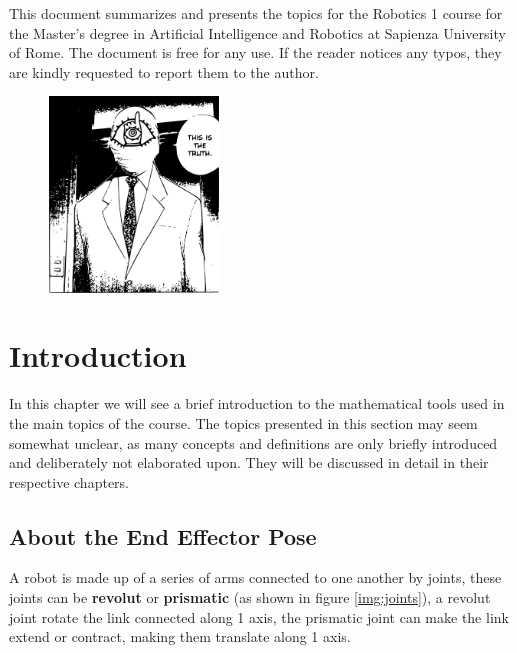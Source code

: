 \documentclass[10pt, letterpaper]{report}
\newcommand{\titolo}{Robotics 1 }
\begin{document}
\newpage
\Large
This document summarizes and presents the topics for the \titolo course for the Master's degree in Artificial Intelligence and Robotics at Sapienza University of Rome. The document is free for any use. If the reader notices any typos, they are kindly requested to report them to the author.
\vfill
\begin{figure}[h!]
    \raggedright
    \includegraphics[width=0.4\textwidth,right ]{../../preamble/tomodachi.pdf} 
\end{figure}
\newpage %
\normalsize

\tableofcontents 
\newpage

\fancyhf{}
\fancyhead[L]{\nouppercase{\leftmark}}
\fancyfoot[C]{\thepage}
\fancyfoot[L]{\titolo}
\newtheorem{definition}{Definition}
\newtheorem{proposition}{Proposition}
\newtheorem{theorem}{Theorem}
\chapter{Introduction}
In this chapter we will see a brief introduction to the mathematical tools used in the main topics of the course. The topics presented in this section may seem somewhat unclear, as many concepts and definitions are only briefly introduced and deliberately not elaborated upon. They will be discussed in detail in their respective chapters.\bigskip
\section{About the End Effector Pose}
A robot is made up of a series of arms connected to one another by joints, these joints can be \textbf{revolut} or \textbf{prismatic} (as shown in figure \ref{img:joints}), a revolut joint rotate the link connected along 1 axis, the prismatic joint can make the link extend or contract, making them translate along 1 axis.
\end{document}

